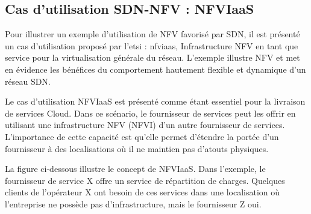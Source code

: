 
\subsection{Cas d'utilisation SDN-NFV : NFVIaaS}

Pour illustrer un exemple d'utilisation de NFV favorisé par SDN, il est présenté un cas d'utilisation proposé par l'\gls{etsi} : \gls{nfv}\gls{iaas}, Infrastructure NFV en tant que service pour la virtualisation générale du réseau. L'exemple illustre NFV et met en évidence les bénéfices du comportement hautement flexible et dynamique d'un réseau SDN.

Le cas d'utilisation NFVIaaS est présenté comme étant essentiel pour la livraison de services Cloud. Dans ce scénario, le fournisseur de services peut les offrir en utilisant une infrastructure NFV (NFVI) d'un autre fournisseur de services. L'importance de cette capacité est qu'elle permet d'étendre la portée d'un fournisseur à des localisations où il ne maintien pas d'atouts physiques.

La figure ci-dessous illustre le concept de NFVIaaS. Dans l'exemple, le fournisseur de service X offre un service de répartition de charges. Quelques clients de l'opérateur X ont besoin de ces services dans une localisation où l'entreprise ne possède pas d'infrastructure, mais le fournisseur Z oui.\\



